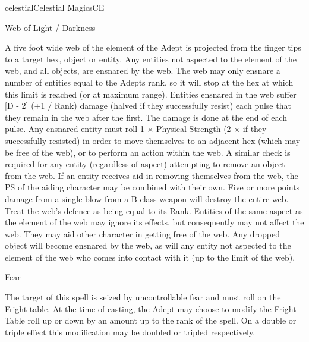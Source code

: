 \begin{College}[1.3]{celestial}{Celestial Magics}{CE}
\begin{spell}[S-6]{Web of Light / Darkness}
\begin{effects}
A five foot wide web of the element of the Adept is projected from the
finger tips to a target hex, object or entity.  Any entities not
aspected to the element of the web, and all objects, are ensnared by
the web.  The web may only ensnare a number of entities equal to the
Adepts rank, so it will stop at the hex at which this limit is reached
(or at maximum range).  Entities ensnared in the web suffer [D - 2]
(+1 / Rank) damage (halved if they successfully resist) each pulse
that they remain in the web after the first. The damage is done at the
end of each pulse. Any ensnared entity must roll 1 × Physical Strength
(2 × if they successfully resisted) in order to move themselves to an
adjacent hex (which may be free of the web), or to perform an action
within the web. A similar check is required for any entity (regardless
of aspect) attempting to remove an object from the web. If an entity
receives aid in removing themselves from the web, the PS of the aiding
character may be combined with their own.  Five or more points damage
from a single blow from a B-class weapon will destroy the entire web.
Treat the web’s defence as being equal to its Rank.  Entities of the
same aspect as the element of the web may ignore its effects, but
consequently may not affect the web.  They may aid other character in
getting free of the web.  Any dropped object will become ensnared by
the web, as will any entity not aspected to the element of the web who
comes into contact with it (up to the limit of the web).
\end{effects}
\end{spell}

\begin{spell}[S-7]{Fear}

\begin{effects}
The target of this spell is seized by uncontrollable fear and must
roll on the Fright table.  At the time of casting, the Adept may
choose to modify the Fright Table roll up or down by an amount up to
the rank of the spell.  On a double or triple effect this modification
may be doubled or tripled respectively.
\end{effects}
\end{spell}


\end{College}
